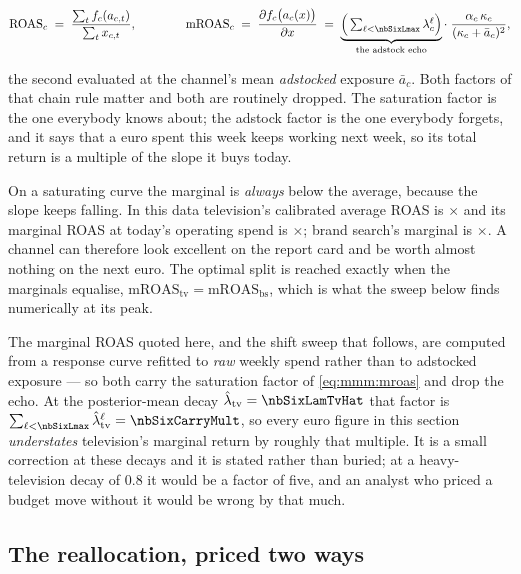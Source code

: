 \begin{equation}
  \text{ROAS}_c \;=\; \frac{\sum_t f_c(a_{c,t})}{\sum_t x_{c,t}},
  \qquad\qquad
  \text{mROAS}_c \;=\; \frac{\partial f_c\big(a_c(x)\big)}{\partial x}
    \;=\; \underbrace{\Big(\textstyle\sum_{\ell < \nbSixLmax} \lambda_c^{\ell}\Big)}_{\text{the adstock echo}}
      \cdot\; \frac{\alpha_c\, \kappa_c}{(\kappa_c + \bar a_c)^2} ,
  \label{eq:mmm:mroas}
\end{equation}

the second evaluated at the channel's mean \emph{adstocked} exposure $\bar a_c$. Both factors of
that chain rule matter and both are routinely dropped. The saturation factor is the one everybody
knows about; the adstock factor is the one everybody forgets, and it says that a euro spent this
week keeps working next week, so its total return is a multiple of the slope it buys today.

On a saturating curve the marginal is \emph{always} below the average, because the slope keeps
falling. In this data television's calibrated average ROAS is \nbSixAvgRoasTv$\times$ and its
marginal ROAS at today's operating spend is \nbSixMargRoasTv$\times$; brand search's marginal is
\nbSixMargRoasBs$\times$. A channel can therefore look excellent on the report card and be worth
almost nothing on the next euro. The optimal split is reached exactly when the marginals equalise,
$\text{mROAS}_{\text{tv}} = \text{mROAS}_{\text{bs}}$, which is what the sweep below finds
numerically at its peak.

\begin{remark}
The marginal ROAS quoted here, and the shift sweep that follows, are computed from a response curve
refitted to \emph{raw} weekly spend rather than to adstocked exposure --- so both carry the
saturation factor of \cref{eq:mmm:mroas} and drop the echo. At the posterior-mean decay
$\hat\lambda_{\text{tv}} = \nbSixLamTvHat$ that factor is
$\sum_{\ell < \nbSixLmax} \hat\lambda^{\ell}_{\text{tv}} = \nbSixCarryMult$, so every euro figure in
this section \emph{understates} television's marginal return by roughly that multiple. It is a small
correction at these decays and it is stated rather than buried; at a heavy-television decay of $0.8$
it would be a factor of five, and an analyst who priced a budget move without it would be wrong by
that much.
\end{remark}

\subsection*{The reallocation, priced two ways}

